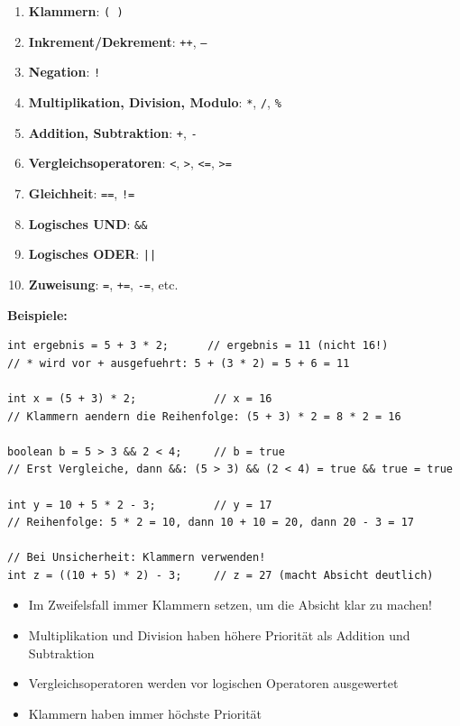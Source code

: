 \begin{enumerate}
	\item \textbf{Klammern}: \texttt{( )}
	\item \textbf{Inkrement/Dekrement}: \texttt{++}, \texttt{--}
	\item \textbf{Negation}: \texttt{!}
	\item \textbf{Multiplikation, Division, Modulo}: \texttt{*}, \texttt{/}, \texttt{\%}
	\item \textbf{Addition, Subtraktion}: \texttt{+}, \texttt{-}
	\item \textbf{Vergleichsoperatoren}: \texttt{<}, \texttt{>}, \texttt{<=}, \texttt{>=}
	\item \textbf{Gleichheit}: \texttt{==}, \texttt{!=}
	\item \textbf{Logisches UND}: \texttt{\&\&}
	\item \textbf{Logisches ODER}: \texttt{||}
	\item \textbf{Zuweisung}: \texttt{=}, \texttt{+=}, \texttt{-=}, etc.
\end{enumerate}

\textbf{Beispiele:}
\begin{lstlisting}
int ergebnis = 5 + 3 * 2;      // ergebnis = 11 (nicht 16!)
// * wird vor + ausgefuehrt: 5 + (3 * 2) = 5 + 6 = 11

int x = (5 + 3) * 2;            // x = 16
// Klammern aendern die Reihenfolge: (5 + 3) * 2 = 8 * 2 = 16

boolean b = 5 > 3 && 2 < 4;     // b = true
// Erst Vergleiche, dann &&: (5 > 3) && (2 < 4) = true && true = true

int y = 10 + 5 * 2 - 3;         // y = 17
// Reihenfolge: 5 * 2 = 10, dann 10 + 10 = 20, dann 20 - 3 = 17

// Bei Unsicherheit: Klammern verwenden!
int z = ((10 + 5) * 2) - 3;     // z = 27 (macht Absicht deutlich)
\end{lstlisting}

\begin{achtung}
	\begin{itemize}
		\item Im Zweifelsfall immer Klammern setzen, um die Absicht klar zu machen!
		\item Multiplikation und Division haben höhere Priorität als Addition und Subtraktion
		\item Vergleichsoperatoren werden vor logischen Operatoren ausgewertet
		\item Klammern haben immer höchste Priorität
	\end{itemize}
\end{achtung}
